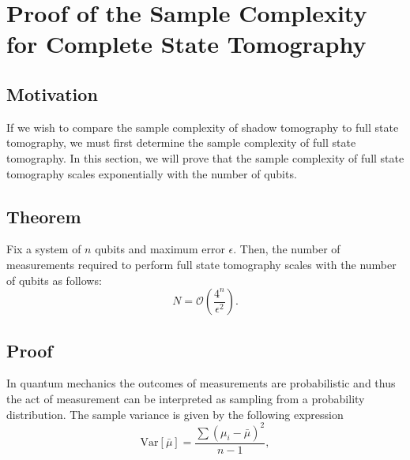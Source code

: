 \documentclass[12pt]{article}
\begin{document}
    
        

    \section{Proof of the Sample Complexity for Complete State Tomography}
    \subsection{Motivation}
    If we wish to compare the sample complexity of shadow tomography to full state tomography, we must first determine the sample complexity of full state tomography. In this section, we will prove that the sample complexity of full state tomography scales exponentially with the number of qubits.

    \subsection{Theorem}
    Fix a system of $n$ qubits and maximum error $\epsilon$. Then, the number of measurements required to perform full state tomography scales with the number of qubits as follows:
    \begin{equation*}
        N = \mathcal{O}\left(\frac{4^n}{\epsilon^2}\right).
    \end{equation*}

    \subsection{Proof}
    In quantum mechanics the outcomes of measurements are probabilistic and thus the act of measurement can be interpreted as sampling from a probability distribution. The sample variance is given by the following expression
    \begin{equation}
        \text{Var}[\bar{\mu}] = \frac{\sum (\mu_i - \bar{\mu})^2}{n-1},
    \end{equation}
\end{document}
